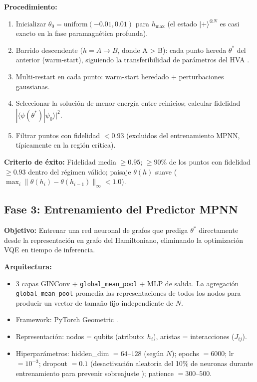 \documentclass[11pt,a4paper,spanish]{book}
\begin{document}
\textbf{Procedimiento:}
\begin{enumerate}
    \item Inicializar $\theta_0 = \text{uniform}(-0.01, 0.01)$ para $h_{\max}$ (el estado $|+\rangle^{\otimes N}$ es casi exacto en la fase paramagnética profunda).
    \item Barrido descendente ($h = A \to B$, donde A > B): cada punto hereda $\theta^*$ del anterior (warm-start), siguiendo la transferibilidad de parámetros del HVA \citep{mele2022, puig2025}.
    \item Multi-restart en cada punto: warm-start heredado + perturbaciones gaussianas.
    \item Seleccionar la solución de menor energía entre reinicios; calcular fidelidad $|\langle \psi(\theta^*) | \psi_0 \rangle|^2$.
    \item Filtrar puntos con fidelidad $< 0.93$ (excluidos del entrenamiento MPNN, típicamente en la región crítica).
\end{enumerate}

\textbf{Criterio de éxito:} Fidelidad media $\geq 0.95$; $\geq 90\%$ de los puntos con fidelidad $\geq 0.93$ dentro del régimen válido; paisaje $\theta(h)$ suave ($\max_i \|\theta(h_i) - \theta(h_{i-1})\|_\infty < 1.0$).

\subsection{Fase 3: Entrenamiento del Predictor MPNN}

\textbf{Objetivo:} Entrenar una red neuronal de grafos que prediga $\theta^*$ directamente desde la representación en grafo del Hamiltoniano, eliminando la optimización VQE en tiempo de inferencia.

\textbf{Arquitectura:}
\begin{itemize}
    \item 3 capas GINConv \citep{xu2019} + \texttt{global\_mean\_pool} + MLP de salida. La agregación \texttt{global\_mean\_pool} promedia las representaciones de todos los nodos para producir un vector de tamaño fijo independiente de $N$.
    \item Framework: PyTorch Geometric \citep{fey2019}.
    \item Representación: nodos = qubits (atributo: $h_i$), aristas = interacciones ($J_{ij}$).
    \item Hiperparámetros: hidden\_dim $= 64$--$128$ (según $N$); epochs $= 6000$; lr $= 10^{-3}$; dropout $= 0.1$ (desactivación aleatoria del 10\% de neuronas durante entrenamiento para prevenir sobreajuste \citep{gal2016}); patience $= 300$--$500$.
\end{itemize}
\end{document}
